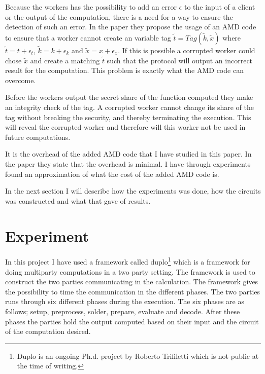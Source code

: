 \documentclass[10pt,a4paper]{article}
\newcommand{\todo}[1]{}
\renewcommand{\todo}[1]{{\color{red} TODO: {#1}} \\}
\begin{document}
Because the workers has the possibility to add an error $\epsilon$ to the input of a client or the output of the computation, there is a need for a way to ensure the detection of such an error. In the paper they propose the usage of an AMD code to ensure that a worker cannot create an variable tag $\tilde{t}=Tag(\tilde{k},\tilde{x})$ where $\tilde{t}=t+\epsilon_t$, $\tilde{k}=k+\epsilon_k$ and $\tilde{x}=x+\epsilon_x$. If this is possible a corrupted worker could chose $\tilde{x}$ and create a matching $\tilde{t}$ such that the protocol will output an incorrect result for the computation. This problem is exactly what the AMD code can overcome.

Before the workers output the secret share of the function computed they make an integrity check of the tag. A corrupted worker cannot change its share of the tag without breaking the security, and thereby terminating the execution. This will reveal the corrupted worker and therefore will this worker not be used in future computations. 

It is the overhead of the added AMD code that I have studied in this paper. In the paper they state that the overhead is minimal. I have through experiments found an approximation of what the cost of the added AMD code is.

\bigskip
In the next section I will describe how the experiments was done, how the circuits was constructed and what that gave of results.

\section{Experiment}
In this project I have used a framework called duplo\footnote{Duplo is an ongoing Ph.d. project by Roberto Trifiletti which is not public at the time of writing.} which is a framework for doing multiparty computations in a two party setting. The framework is used to construct the two parties communicating in the calculation. The framework gives the possibility to time the communication in the different phases. The two parties runs through six different phases during the execution. The six phases are as follows; setup, preprocess, solder, prepare, evaluate and decode. After these phases the parties hold the output computed based on their input and the circuit of the computation desired.
\end{document}

